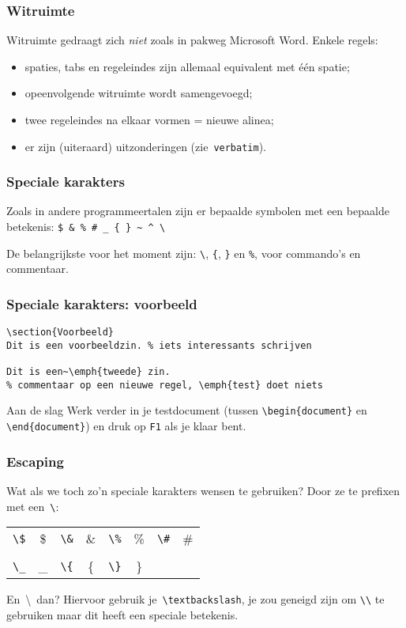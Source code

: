 \begin{frame}
  \frametitle{Witruimte}
  Witruimte gedraagt zich \emph{niet} zoals in pakweg Microsoft Word. Enkele regels:
  \begin{itemize}
  	\item spaties, tabs en regeleindes zijn allemaal equivalent met \'e\'en spatie;
  	\item opeenvolgende witruimte wordt samengevoegd;
  	\item twee regeleindes na elkaar vormen = nieuwe alinea;
  	\item er zijn (uiteraard) uitzonderingen (zie~\texttt{verbatim}).
  \end{itemize}
\end{frame}

\begin{frame}[fragile]
  \frametitle{Speciale karakters}
  Zoals in andere programmeertalen zijn er bepaalde symbolen met een bepaalde betekenis: \verb|$ & % # _ { } ~ ^ \|

  De belangrijkste voor het moment zijn: \verb|\|, \verb|{|, \verb|}| en \verb|%|, voor commando's en commentaar.
\end{frame}

\begin{frame}[fragile]
  \frametitle{Speciale karakters: voorbeeld}

  \begin{verbatim}
\section{Voorbeeld}
Dit is een voorbeeldzin. % iets interessants schrijven

Dit is een~\emph{tweede} zin.
% commentaar op een nieuwe regel, \emph{test} doet niets
  \end{verbatim}

  \begin{exampleblock}{Aan de slag}
    Werk verder in je testdocument (tussen \texttt{\textcolor{uagreen}{\textbackslash begin}\{document\}} en \texttt{\textcolor{uagreen}{\textbackslash end}\{document\}}) en druk op \texttt{F1} als je klaar bent.
  \end{exampleblock}
\end{frame}

\begin{frame}[fragile]
  \frametitle{Escaping}

  Wat als we toch zo'n speciale karakters wensen te gebruiken? Door ze te prefixen met een~\verb|\|:

  \begin{tabular}[]{cc|cc|cc|cc}
    \verb|\$| & \$ & 
    \verb|\&| & \& &
    \verb|\%| & \% &
    \verb|\#| & \# \\ \\
    \verb|\_| & \_ &
    \verb|\{| & \{ &
    \verb|\}| & \}
  \end{tabular}

  En~\textbackslash~dan? Hiervoor gebruik je~\verb|\textbackslash|, je zou geneigd zijn om \verb|\\| te gebruiken maar dit heeft een speciale betekenis.
\end{frame}

